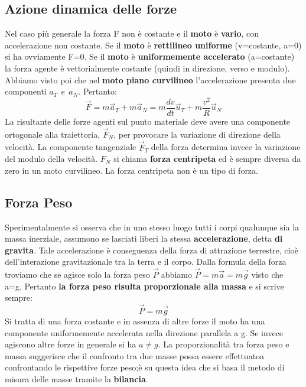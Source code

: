 \documentclass{article}
\numberwithin{equation}{subsection}
\begin{document}
\subsection{Azione dinamica delle forze}
Nel caso più generale la forza F non è costante e il \textbf{moto} è \textbf{vario}, con accelerazione non costante. Se il \textbf{moto} è \textbf{rettilineo uniforme} (v=costante, a=0) si ha ovviamente F=0. Se il \textbf{moto} è \textbf{uniformemente accelerato} (a=costante) la forza agente è vettorialmente costante (quindi in direzione, verso e modulo). Abbiamo visto poi che nel \textbf{moto piano curvilineo} l'accelerazione presenta due componenti $a_T \ \ e \ \ a_N$. Pertanto:
\begin{equation}
    \vec{F} = m\vec{a}_T+m\vec{a}_N= m\frac{dv}{dt}\vec{u}_T+m\frac{v^2}{R}\vec{u}_N
\end{equation}
La risultante delle forze agenti sul punto materiale deve avere una componente ortogonale alla traiettoria, $\vec{F}_N$, per provocare la variazione di direzione della velocità. La componente tangenziale $\vec{F}_T$ della forza determina invece la variazione del modulo della velocità. $F_N$ si chiama \textbf{forza centripeta} ed è sempre diversa da zero in un moto curvilineo. La forza centripeta non è un tipo di forza.
\subsection{Forza Peso}
Sperimentalmente si osserva che in uno stesso luogo tutti i corpi qualunque sia la massa inerziale, assumono se lasciati liberi la stessa \textbf{accelerazione}, detta  \textbf{di gravita}. Tale accelerazione è conseguenza della forza di attrazione terrestre, cioè dell'interazione gravitazionale tra la terra e il corpo. Dalla formula della forza troviamo che se agisce solo la forza peso $\vec{P}$ abbiamo $\vec{P}=m\vec{a}=m\vec{g}$ visto che a=g. Pertanto \textbf{la forza peso risulta proporzionale alla massa} e si scrive sempre:
\begin{equation}
    \vec{P}=m\vec{g}
\end{equation}
Si tratta di una forza costante e in assenza di altre forze il moto ha una componente uniformemente accelerata nella direzione parallela a g. Se invece agiscono altre forze in generale si ha $a \neq g$. La proporzionalità tra forza peso e massa suggerisce che il confronto tra due masse possa essere effettuatoa confrontando le rispettive forze peso;è su questa idea che si basa il metodo di misura delle masse tramite la \textbf{bilancia}.
\end{document}
